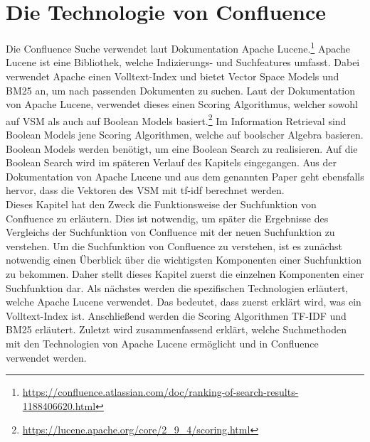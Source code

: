 \chapter{Die Technologie von Confluence}
\label{chap:technologie-von-confluence}
Die Confluence Suche verwendet laut Dokumentation Apache Lucene.\footnote{\url{https://confluence.atlassian.com/doc/ranking-of-search-results-1188406620.html}}
Apache Lucene ist eine Bibliothek, welche Indizierungs- und Suchfeatures umfasst.
Dabei verwendet Apache einen Volltext-Index und bietet Vector Space Models und BM25 an, um nach passenden Dokumenten zu suchen.
Laut der Dokumentation von Apache Lucene, verwendet dieses einen Scoring Algorithmus, welcher sowohl auf VSM als auch auf Boolean Models basiert.\footnote{\url{https://lucene.apache.org/core/2_9_4/scoring.html}}
Im Information Retrieval sind Boolean Models jene Scoring Algorithmen, welche auf boolscher Algebra basieren.
Boolean Models werden benötigt, um eine Boolean Search zu realisieren.
Auf die Boolean Search wird im späteren Verlauf des Kapitels eingegangen.
Aus der Dokumentation von Apache Lucene und aus dem genannten Paper geht ebensfalls hervor, dass die Vektoren des VSM mit tf-idf berechnet werden.\\

Dieses Kapitel hat den Zweck die Funktionsweise der Suchfunktion von Confluence zu erläutern.
Dies ist notwendig, um später die Ergebnisse des Vergleichs der Suchfunktion von Confluence mit der neuen Suchfunktion zu verstehen.
Um die Suchfunktion von Confluence zu verstehen, ist es zunächst notwendig einen Überblick über die wichtigsten Komponenten einer Suchfunktion zu bekommen.
Daher stellt dieses Kapitel zuerst die einzelnen Komponenten einer Suchfunktion dar.
Als nächstes werden die spezifischen Technologien erläutert, welche Apache Lucene verwendet.
Das bedeutet, dass zuerst erklärt wird, was ein Volltext-Index ist.
Anschließend werden die Scoring Algorithmen TF-IDF und BM25 erläutert.
Zuletzt wird zusammenfassend erklärt, welche Suchmethoden mit den Technologien von Apache Lucene ermöglicht und in Confluence verwendet werden.

